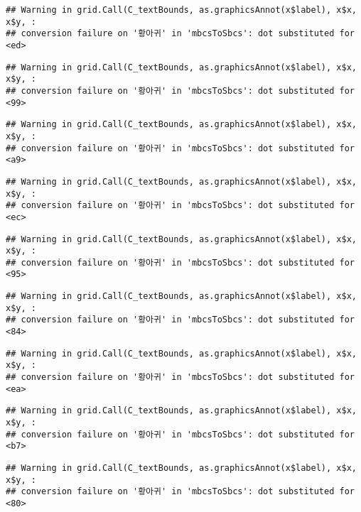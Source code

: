 \documentclass[
]{article}
\begin{document}
\begin{verbatim}
## Warning in grid.Call(C_textBounds, as.graphicsAnnot(x$label), x$x, x$y, :
## conversion failure on '황아귀' in 'mbcsToSbcs': dot substituted for <ed>
\end{verbatim}

\begin{verbatim}
## Warning in grid.Call(C_textBounds, as.graphicsAnnot(x$label), x$x, x$y, :
## conversion failure on '황아귀' in 'mbcsToSbcs': dot substituted for <99>
\end{verbatim}

\begin{verbatim}
## Warning in grid.Call(C_textBounds, as.graphicsAnnot(x$label), x$x, x$y, :
## conversion failure on '황아귀' in 'mbcsToSbcs': dot substituted for <a9>
\end{verbatim}

\begin{verbatim}
## Warning in grid.Call(C_textBounds, as.graphicsAnnot(x$label), x$x, x$y, :
## conversion failure on '황아귀' in 'mbcsToSbcs': dot substituted for <ec>
\end{verbatim}

\begin{verbatim}
## Warning in grid.Call(C_textBounds, as.graphicsAnnot(x$label), x$x, x$y, :
## conversion failure on '황아귀' in 'mbcsToSbcs': dot substituted for <95>
\end{verbatim}

\begin{verbatim}
## Warning in grid.Call(C_textBounds, as.graphicsAnnot(x$label), x$x, x$y, :
## conversion failure on '황아귀' in 'mbcsToSbcs': dot substituted for <84>
\end{verbatim}

\begin{verbatim}
## Warning in grid.Call(C_textBounds, as.graphicsAnnot(x$label), x$x, x$y, :
## conversion failure on '황아귀' in 'mbcsToSbcs': dot substituted for <ea>
\end{verbatim}

\begin{verbatim}
## Warning in grid.Call(C_textBounds, as.graphicsAnnot(x$label), x$x, x$y, :
## conversion failure on '황아귀' in 'mbcsToSbcs': dot substituted for <b7>
\end{verbatim}

\begin{verbatim}
## Warning in grid.Call(C_textBounds, as.graphicsAnnot(x$label), x$x, x$y, :
## conversion failure on '황아귀' in 'mbcsToSbcs': dot substituted for <80>
\end{verbatim}
\end{document}
